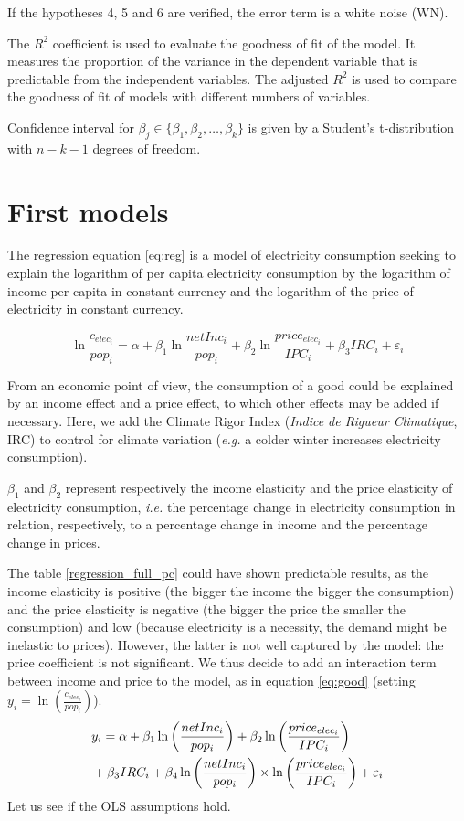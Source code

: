 If the hypotheses 4, 5 and 6 are verified, the error term is a white noise (WN). 

The $R^2$ coefficient is used to evaluate the goodness of fit of the model. It measures the proportion of the variance in the dependent variable that is predictable from the independent variables. The adjusted $R^2$ is used to compare the goodness of fit of models with different numbers of variables.

Confidence interval for $\beta_j \in \{\beta_1, \beta_2, \ldots, \beta_k\}$ is given by a Student's t-distribution with $n - k - 1$ degrees of freedom.

\section{First models}
The regression equation \eqref{eq:reg} is a model of electricity consumption seeking to explain the logarithm of per capita electricity consumption by the logarithm of income per capita in constant currency and the logarithm of the price of electricity in constant currency. 

\begin{equation} \label{eq:reg}
\ln{\frac{c_{elec_i}}{pop_i}} = \alpha + \beta_1 \ln{\frac{{netInc_i}}{pop_i}} + \beta_2 \ln{\frac{price_{elec_i}}{IPC_i}} + \beta_3 IRC_i + \varepsilon_i
\end{equation}

From an economic point of view, the consumption of a good could be explained by an income effect and a price effect, to which other effects may be added if necessary. Here, we add the Climate Rigor Index (\textit{Indice de Rigueur Climatique}, IRC) to control for climate variation (\textit{e.g.} a colder winter increases electricity consumption).

$\beta_1$ and $\beta_2$ represent respectively the income elasticity and the price elasticity of electricity consumption, \textit{i.e.} the percentage change in electricity consumption in relation, respectively, to a percentage change in income and the percentage change in prices. 

The table \ref{regression_full_pc} could have shown predictable results, as the income elasticity is positive (the bigger the income the bigger the consumption) and the price elasticity is negative (the bigger the price the smaller the consumption) and low (because electricity is a necessity, the demand might be inelastic to prices). However, the latter is not well captured by the model: the price coefficient is not significant. We thus decide to add an interaction term between income and price to the model, as in equation \eqref{eq:good} (setting $y_i = \ln{\left(\frac{c_{elec_i}}{pop_i}\right)}$). 
\begin{align} \label{eq:good}
    &y_i = \alpha + \beta_1 \ln{\left(\frac{{netInc_i}}{pop_i}\right)} + \beta_2 \ln{\left(\frac{price_{elec_i}}{IPC_i}\right)} \notag \\
    &+ \beta_3 IRC_i + \beta_4 \ln{\left(\frac{{netInc_i}}{pop_i}\right)} \times \ln{\left(\frac{price_{elec_i}}{IPC_i}\right)} + \varepsilon_i
\end{align}
Let us see if the OLS assumptions hold. 

